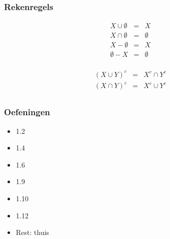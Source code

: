 \documentclass[dutch]{../khlslides}
\newcommand{\union}{\cup}
\newcommand{\intersect}{\cap}
\begin{document}
\begin{frame}
  \frametitle{Rekenregels}
  \[
    \begin{array}{rclclr}
      X \union \emptyset & = & X \\
      X \intersect \emptyset & = & \emptyset \\
      X - \emptyset & = & X \\
      \emptyset - X & = & \emptyset \\
    \end{array}
  \]

  \[
    \begin{array}{rclclr}
      (X \union Y)^c & = & X^c \intersect Y^c \\
      (X \intersect Y)^c & = & X^c \union Y^c \\
    \end{array}
  \]
\end{frame}

\begin{frame}
  \frametitle{Oefeningen}
  \begin{itemize}
    \item 1.2
    \item 1.4
    \item 1.6
    \item 1.9
    \item 1.10
    \item 1.12
    \item Rest: thuis
  \end{itemize}
\end{frame}
\end{document}
